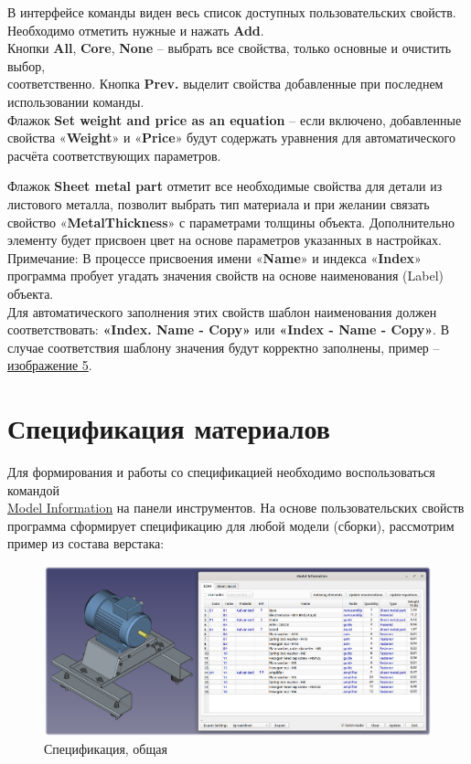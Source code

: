 \documentclass[a4paper,12pt]{article}
\begin{document}
В интерфейсе команды виден весь список доступных пользовательских свойств. Необходимо отметить нужные и нажать \textbf{Add}.\\

Кнопки \textbf{All}, \textbf{Core}, \textbf{None} -- выбрать все свойства, только основные и очистить выбор,\\соответственно. Кнопка \textbf{Prev.} выделит свойства добавленные при последнем использовании команды.\\

Флажок \textbf{Set weight and price as an equation} -- если включено, добавленные свойства «\textbf{Weight}» и «\textbf{Price}» будут содержать уравнения для автоматического расчёта соответствующих параметров.

Флажок \textbf{Sheet metal part} отметит все необходимые свойства для детали из листового металла, позволит выбрать тип материала и при желании связать свойство «\textbf{MetalThickness}» с параметрами толщины объекта. Дополнительно элементу будет присвоен цвет на основе параметров указанных в настройках.\\

Примечание: В процессе присвоения имени «\textbf{Name}» и индекса «\textbf{Index}» программа пробует угадать значения свойств на основе наименования (Label) объекта.\\Для автоматического заполнения этих свойств шаблон наименования должен соответствовать: \textbf{«Index. Name - Copy»} или \textbf{«Index - Name - Copy»}. В случае соответствия шаблону значения будут корректно заполнены, пример -- \hyperref[sec:properties]{изображение 5}.

\pagebreak


\section{Спецификация материалов}

Для формирования и работы со спецификацией необходимо воспользоваться командой\\\hyperref[sec:4]{Model Information} на панели инструментов. На основе пользовательских свойств программа сформирует спецификацию для любой модели (сборки), рассмотрим пример из состава верстака:

\begin{figure}[htp]
	\centering
	\includegraphics[width=1\textwidth]{img/info_bom.png}
	\caption{Спецификация, общая}
	\label{sec:info_bom}
\end{figure}
\end{document}
